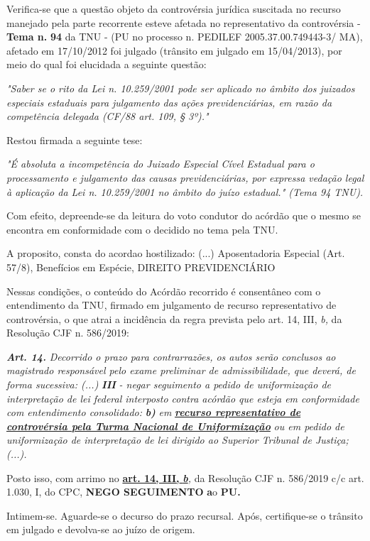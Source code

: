 \documentclass[12pt]{article}
\begin{document}
\justifying
\noindent Verifica-se que a questão objeto da controvérsia jurídica suscitada no recurso manejado pela parte recorrente esteve afetada no representativo da controvérsia - \textbf{Tema n. }\textbf{94} da TNU - (PU no processo n. PEDILEF 2005.37.00.749443-3/ MA),  afetado em 17/10/2012 foi julgado (trânsito em julgado em 15/04/2013), por meio do qual foi elucidada a seguinte questão:

\noindent \textit{"Saber se o rito da Lei n. 10.259/2001 pode ser aplicado no âmbito dos juizados especiais estaduais para julgamento das ações previdenciárias, em razão da competência delegada (CF/88 art. 109, § 3º)."}

\noindent Restou firmada a seguinte tese:

\noindent \textit{"É absoluta a incompetência do Juizado Especial Cível Estadual para o processamento e julgamento das causas previdenciárias, por expressa vedação legal à aplicação da Lei n. 10.259/2001 no âmbito do juízo estadual." (Tema 94 TNU).}

\noindent Com efeito, depreende-se da leitura do voto condutor do acórdão que o mesmo se encontra em conformidade com o decidido no  tema pela TNU.

\noindent A proposito, consta do acordao hostilizado: (...) Aposentadoria Especial (Art. 57/8), Benefícios em Espécie, DIREITO PREVIDENCIÁRIO

\noindent Nessas condições, o conteúdo do Acórdão recorrido é consentâneo com o entendimento da TNU, firmado em julgamento de recurso representativo de controvérsia, o que atrai a incidência da regra prevista pelo art. 14, III, \textit{b,} da Resolução CJF n. 586/2019:

\noindent \textit{\textbf{Art. 14.}}\textit{ Decorrido o prazo para contrarrazões, os autos serão conclusos ao magistrado responsável pelo exame preliminar de admissibilidade, que deverá, de forma sucessiva: (...) }\textit{\textbf{III }}\textit{- negar seguimento a pedido de uniformização de interpretação de lei federal interposto contra acórdão que esteja em conformidade com entendimento consolidado: }\textit{\textbf{b)}}\textit{ em }\uline{\textit{\textbf{recurso representativo de controvérsia pela Turma Nacional de Uniformização}}}\textit{ ou em pedido de uniformização de interpretação de lei dirigido ao Superior Tribunal de Justiça;(...).}

\noindent Posto isso, com arrimo no \uline{\textbf{art. 14, III, }}\uline{\textit{\textbf{b}}}\textit{,} da Resolução CJF n. 586/2019 c/c art. 1.030, I, do CPC, \textbf{NEGO SEGUIMENTO }\textbf{a}o\textbf{ PU}\textbf{.}

\noindent Intimem-se. Aguarde-se o decurso do prazo recursal. Após, certifique-se o trânsito em julgado e devolva-se ao juízo de origem.
\end{document}
